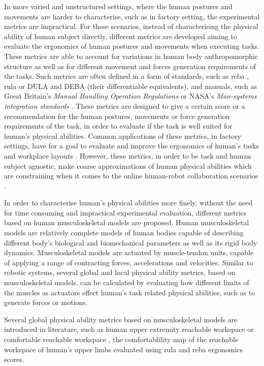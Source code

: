 In more varied and unstructured settings, where the human postures and movements are harder to characterise, such as in factory setting, the experimental metrics are impractical. For these scenarios, instead of characterising the physical ability of human subject directly, different metrics are developed aiming to evaluate the ergonomics of human postures and movements when executing tasks. These metrics are able to account for variations in human body anthropomorphic structure as well as for different movement and forces generation requirements of the tasks. Such metrics are often defined in a form of standards, such as \gls{reba} \cite{reba}, \gls{rula} \cite{rula} or DULA and DEBA \cite{Yazdani2022} (their differentiable equivalents), and manuals, such as Great Britain's \textit{Manual Handling Operation Regulations} \cite{health1992manual} or NASA's \textit{Man-systems integration standards} \cite{nasa}. These metrics are designed to give a certain score or a recommendation for the human postures, movements or force generation requirements of the task, in order to evaluate if the task is well suited for human's physical abilities. Common applications of these metrics, in factory settings, have for a goal to evaluate and improve the ergonomics of human's tasks \cite{Busch2017} and workplace layouts \cite{ORE20161, Lietaert2019}. However, these metrics, in order to be task and human subject agnostic, make coarse approximations of human physical abilities which are constraining when it comes to the online human-robot collaboration scenarios \cite{maurice2015}. 

In order to characterise human's physical abilities more finely, without the need for time consuming and impractical experimental evaluation, different metrics based on human musculoskeletal models are proposed. Human musculoskeletal models are relatively complete models of human bodies capable of describing different body's biological and biomechanical parameters as well as its rigid body dynamics. Musculoskeletal models are actuated by muscle-tendon units, capable of applying a range of contracting forces, accelerations and velocities. Similar to robotic systems, several global and local physical ability metrics, based on musculoskeletal models, can be calculated by evaluating how different limits of the muscles as actuators effect human's task related physical abilities, such as to generate forces or motions. 

Several global physical ability metrics based on musculoskeletal models are introduced in literature, such as human upper extremity reachable workspace \cite{Lenarcic1994,Kurillo2013} or comfortable reachable workspace \cite{Figueredo2021}, the comfortablility map of the reachable workspace of human's upper limbs evaluated using \gls{rula} and \gls{reba} ergonomics scores.  

